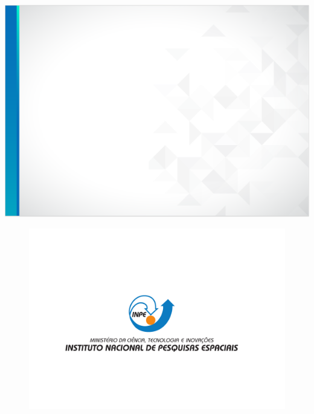 \documentclass[10pt,aspectratio=169]{beamer}
\begin{document}
\usebackgroundtemplate%
{%
  \includegraphics[width=\paperwidth,height=\paperheight]{fundo_slide_inpe_sem_logo.png}%
}

\begingroup
{}
{\nologo
\begin{frame}
  \begin{figure}[H]
    \vspace{-4em}
		\centering
    \hspace*{1.5em}\includegraphics[width=1.\textwidth]{DesinacaoNominativaCentralizada2020.pdf}
  \end{figure}
\end{frame}
}
\endgroup
\end{document}
